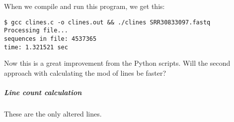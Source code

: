 \begin{Shaded}
\begin{Highlighting}[]
\OperatorTok{(\&}\OperatorTok{,}\OperatorTok{);}
\OperatorTok{=} \OperatorTok{(}\OperatorTok{)(}\OperatorTok{{-}}\OperatorTok{)} \OperatorTok{+}
               \OperatorTok{(}\OperatorTok{)(}\OperatorTok{{-}}\OperatorTok{)} \OperatorTok{/} \OperatorTok{;}

\OperatorTok{(}\OperatorTok{,}\OperatorTok{);}
\OperatorTok{(}\OperatorTok{,}\OperatorTok{);}

   \OperatorTok{;}
\OperatorTok{\}}
\end{Highlighting}
\end{Shaded}

When we compile and run this program, we get this:

\begin{verbatim}
$ gcc clines.c -o clines.out && ./clines SRR30833097.fastq
Processing file...
sequences in file: 4537365
time: 1.321521 sec
\end{verbatim}

Now this is a great improvement from the Python scripts. Will the second
approach with calculating the mod of lines be faster?

\hypertarget{line-count-calculation-1}{%
\subparagraph{Line count calculation}\label{line-count-calculation-1}}

These are the only altered lines.

\begin{Shaded}
\begin{Highlighting}[]
   \OperatorTok{(}\OperatorTok{!=} \OperatorTok{)} \OperatorTok{\{}
\OperatorTok{(}\OperatorTok{);}
\OperatorTok{(}\OperatorTok{);}
  \OperatorTok{\}}
   \OperatorTok{(}\OperatorTok{(}\OperatorTok{,} \OperatorTok{(}\OperatorTok{),}\OperatorTok{)} \OperatorTok{!=}\OperatorTok{)} \OperatorTok{\{}
\OperatorTok{++;}
  \OperatorTok{\}}
\OperatorTok{=}\OperatorTok{/} \OperatorTok{;}
\end{Highlighting}
\end{Shaded}

